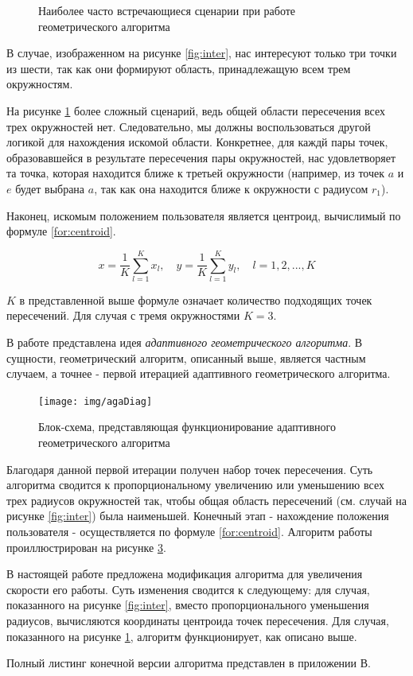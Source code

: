 \begin{figure}[h]
\begin{subfigure}[h]{0.4\textwidth}
        \caption{}
        \label{fig:outer}
    \end{subfigure}
    \caption{Наиболее часто встречающиеся сценарии при работе геометрического алгоритма}
    \label{fig:scenarios}
\end{figure}

В случае, изображенном на рисунке \ref{fig:inter}, нас интересуют только три точки из шести, так как они формируют область, принадлежащую всем трем окружностям.

На рисунке \ref{fig:outer} более сложный сценарий, ведь общей области пересечения всех трех окружностей нет. Следовательно, мы должны воспользоваться другой логикой для нахождения искомой области. Конкретнее, для каждй пары точек, образовавшейся в результате пересечения пары окружностей, нас удовлетворяет та точка, которая находится ближе к третьей окружности (например, из точек $a$ и $e$ будет выбрана $a$, так как она находится ближе к окружности с радиусом $r_1$).

Наконец, искомым положением пользователя является центроид, вычислимый по формуле \ref{for:centroid}.
 
\begin{equation} \label{for:centroid}
    x = \frac{1}{K}\sum^K_{l=1}x_l, \quad y = \frac{1}{K}\sum^K_{l=1}y_l, \quad  l = 1,2,...,K
\end{equation}

$K$ в представленной выше формуле означает количество подходящих точек пересечений. Для случая с тремя окружностями $K=3$.

В работе \cite{brida2013novel} представлена идея \textit{адаптивного геометрического алгоритма}. В сущности, геометрический алгоритм, описанный выше, является частным случаем, а точнее - первой итерацией адаптивного геометрического алгоритма. 

\begin{figure}[ht]
    \centering
    \texttt{[image: img/agaDiag]}
    \caption{Блок-схема, представляющая функционирование адаптивного геометрического алгоритма}
    \label{fig:aga}
\end{figure}

Благодаря данной первой итерации получен набор точек пересечения. Суть алгоритма сводится к пропорциональному увеличению или уменьшению всех трех радиусов окружностей так, чтобы общая область пересечений (см. случай на рисунке \ref{fig:inter}) была наименьшей. Конечный этап - нахождение положения пользователя - осуществляется по формуле \ref{for:centroid}. Алгоритм работы проиллюстрирован на рисунке \ref{fig:aga}.

В настоящей работе предложена модификация алгоритма для увеличения скорости его работы. Суть изменения сводится к следующему: для случая, показанного на рисунке \ref{fig:inter}, вместо пропорционального уменьшения радиусов, вычисляются координаты центроида точек пересечения. Для случая, показанного на рисунке \ref{fig:outer}, алгоритм функционирует, как описано выше. 

Полный листинг конечной версии алгоритма представлен в приложении В.